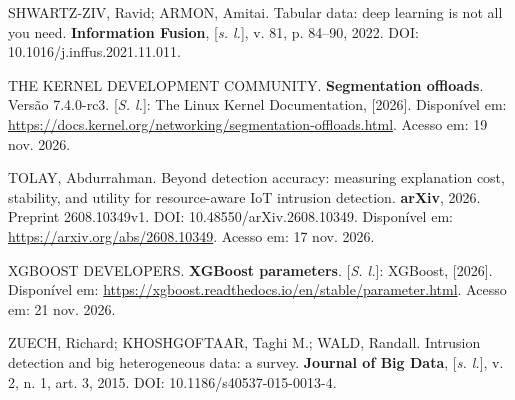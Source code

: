 \documentclass[
  12pt,
  oneside,
  a4paper,
  chapter=TITLE,
  sumario=tradicional,
  english,
  brazil
]{abntex2}
\begin{document}
SHWARTZ-ZIV, Ravid; ARMON, Amitai. Tabular data: deep learning is not all you need.
\textbf{Information Fusion}, [\emph{s. l.}], v. 81, p. 84--90, 2022. DOI:
10.1016/j.inffus.2021.11.011.\par

THE KERNEL DEVELOPMENT COMMUNITY. \textbf{Segmentation offloads}. Versão 7.4.0-rc3. [\emph{S. l.}]:
The Linux Kernel Documentation, [2026]. Disponível em:
\url{https://docs.kernel.org/networking/segmentation-offloads.html}. Acesso em: 19 nov. 2026.\par

TOLAY, Abdurrahman. Beyond detection accuracy: measuring explanation cost, stability, and utility
for resource-aware IoT intrusion detection. \textbf{arXiv}, 2026. Preprint 2608.10349v1. DOI:
10.48550/arXiv.2608.10349. Disponível em: \url{https://arxiv.org/abs/2608.10349}. Acesso em: 17
nov. 2026.\par

XGBOOST DEVELOPERS. \textbf{XGBoost parameters}. [\emph{S. l.}]: XGBoost, [2026]. Disponível em:
\url{https://xgboost.readthedocs.io/en/stable/parameter.html}. Acesso em: 21 nov. 2026.\par

ZUECH, Richard; KHOSHGOFTAAR, Taghi M.; WALD, Randall. Intrusion detection and big heterogeneous
data: a survey. \textbf{Journal of Big Data}, [\emph{s. l.}], v. 2, n. 1, art. 3, 2015. DOI:
10.1186/s40537-015-0013-4.\par
\endgroup
\end{document}
